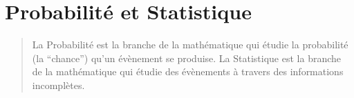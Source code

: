 \part{Probabilité et Statistique}

\vspace{5em}

\begin{quote}
    La Probabilité est la branche de la mathématique qui étudie la probabilité (la ``chance'') qu'un évènement se produise. La Statistique est la branche de la mathématique qui étudie des évènements à travers des informations incomplètes.
\end{quote}

\clearpage